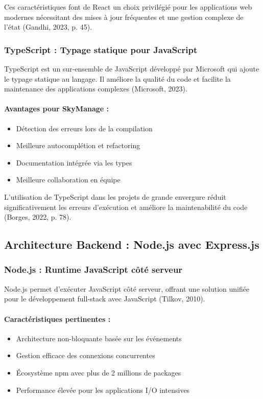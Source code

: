 Ces caractéristiques font de React un choix privilégié pour les applications web modernes nécessitant des mises à jour fréquentes et une gestion complexe de l'état (Gandhi, 2023, p. 45).

\subsubsection{TypeScript : Typage statique pour JavaScript}
TypeScript est un sur-ensemble de JavaScript développé par Microsoft qui ajoute le typage statique au langage. Il améliore la qualité du code et facilite la maintenance des applications complexes (Microsoft, 2023).

\paragraph{Avantages pour SkyManage :}
\begin{itemize}
    \item Détection des erreurs lors de la compilation
    \item Meilleure autocomplétion et refactoring
    \item Documentation intégrée via les types
    \item Meilleure collaboration en équipe
\end{itemize}

L'utilisation de TypeScript dans les projets de grande envergure réduit significativement les erreurs d'exécution et améliore la maintenabilité du code (Borges, 2022, p. 78).

\subsection{Architecture Backend : Node.js avec Express.js}

\subsubsection{Node.js : Runtime JavaScript côté serveur}
Node.js permet d'exécuter JavaScript côté serveur, offrant une solution unifiée pour le développement full-stack avec JavaScript (Tilkov, 2010).

\paragraph{Caractéristiques pertinentes :}
\begin{itemize}
    \item Architecture non-bloquante basée sur les événements
    \item Gestion efficace des connexions concurrentes
    \item Écosystème npm avec plus de 2 millions de packages
    \item Performance élevée pour les applications I/O intensives
\end{itemize}

